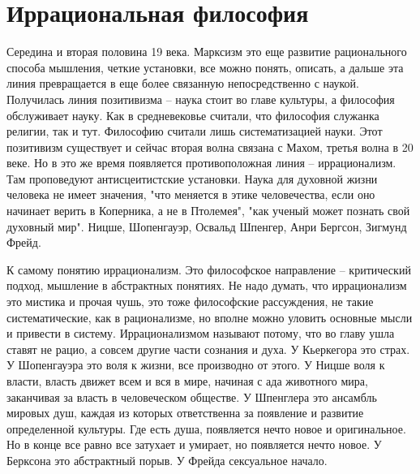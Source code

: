 \documentclass[a4paper, 12pt]{article}
\begin{document}
\section{Иррациональная философия}
Середина и вторая половина 19 века. Марксизм это еще развитие рационального способа мышления, четкие установки, все можно понять, описать, а дальше эта линия превращается в еще более связанную непосредственно с наукой. Получилась линия позитивизма -- наука стоит во главе культуры, а философия обслуживает науку. Как в средневековье считали, что философия служанка религии, так и тут. Философию считали лишь систематизацией науки. Этот позитивизм существует и сейчас вторая волна связана с Махом, третья волна в 20 веке. Но в это же время появляется противоположная линия -- иррационализм. Там проповедуют антисцеитистские установки. Наука для духовной жизни человека не имеет значения, "что меняется в этике человечества, если оно начинает верить в Коперника, а не в Птолемея"{}, "как ученый может познать свой духовный мир". Ницше, Шопенгауэр, Освальд Шпенгер, Анри Бергсон, Зигмунд Фрейд. 

К самому понятию иррационализм. Это философское направление -- критический подход, мышление в абстрактных понятиях. Не надо думать, что иррационализм это мистика и прочая чушь, это тоже философские рассуждения, не такие систематические, как в рационализме, но вполне можно уловить основные мысли и привести в систему. Иррационализмом называют потому, что во главу ушла ставят не рацио, а совсем другие части сознания и духа. У Кьеркегора это страх. У Шопенгауэра это воля к жизни, все производно от этого. У Ницше воля к власти, власть движет всем и вся в мире, начиная с ада животного мира, заканчивая за власть в человеческом обществе. У Шпенглера это ансамбль мировых душ, каждая из которых ответственна за появление и развитие определенной культуры. Где есть душа, появляется нечто новое и оригинальное. Но в конце все равно все затухает и умирает, но появляется нечто новое. У Берксона это абстрактный порыв. У Фрейда сексуальное начало. 
\end{document}
